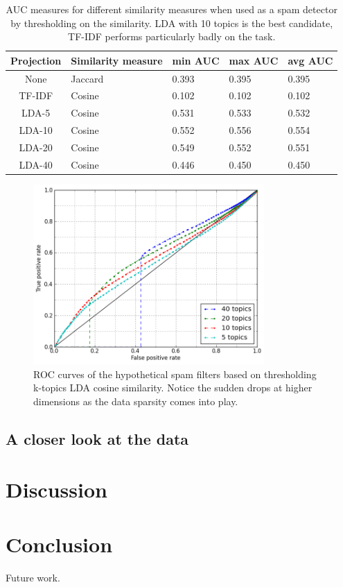 \documentclass[times, 11pt, twocolumn]{article}
\begin{document}
\begin{table}[!h]\centering
	\begin{tabular}{|c|p{1.5cm}|p{1cm}|p{1cm}|p{1cm}|}
	\hline
	Projection & Similarity measure & min AUC & max AUC & avg AUC \\
	\hline
	None & Jaccard & 0.393 & 0.395 & 0.395 \\
	TF-IDF & Cosine & 0.102 & 0.102 & 0.102 \\
	LDA-5 & Cosine & 0.531 & 0.533 & 0.532 \\
	LDA-10 & Cosine & 0.552 & 0.556 & 0.554 \\
	LDA-20 & Cosine & 0.549 & 0.552 & 0.551 \\
	LDA-40 & Cosine & 0.446 & 0.450 & 0.450 \\
	\hline
	\end{tabular}
	\label{perf}
	\caption{AUC measures for different similarity measures when used 
		as a spam detector by thresholding on the similarity. LDA with
		10 topics is the best candidate, TF-IDF performs particularly
	badly on the task.}
\end{table}

\begin{figure}[ht]\centering
	\includegraphics[width=8.8cm]{roc_lda_sim.png}
	\caption{ROC curves of the hypothetical spam filters based on thresholding k-topics LDA cosine
	similarity. Notice the sudden drops at higher dimensions as the data sparsity comes into play.}
\end{figure}
\subsection{A closer look at the data}

\section{Discussion}


\section{Conclusion}
Future work.



\end{document}
